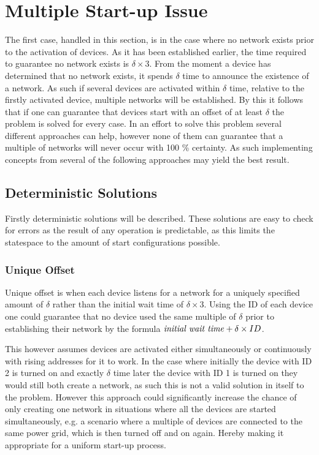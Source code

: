 \section{Multiple Start-up Issue}\label{sec:MSI-CCRC}
The first case, handled in this section, is in the case where no network exists prior to the activation of devices.
As it has been established earlier, the time required to guarantee no network exists is $\delta \times 3$.
From the moment a device has determined that no network exists, it spends $\delta$ time to announce the existence of a network.
As such if several devices are activated within $\delta$ time, relative to the firstly activated device, multiple networks will be established.
By this it follows that if one can guarantee that devices start with an offset of at least $\delta$ the problem is solved for every case.
In an effort to solve this problem several different approaches can help, however none of them can guarantee that a multiple of networks will never occur with 100 \% certainty. 
As such implementing concepts from several of the following approaches may yield the best result.

\subsection{Deterministic Solutions}
Firstly deterministic solutions will be described.
These solutions are easy to check for errors as the result of any operation is predictable, as this limits the statespace to the amount of start configurations possible.

\subsubsection{Unique Offset}
Unique offset is when each device listens for a network for a uniquely specified amount of $\delta$ rather than the initial wait time of $\delta \times 3$.
Using the ID of each device one could guarantee that no device used the same multiple of $\delta$ prior to establishing their network by the formula $\text{\textit{initial wait time}} + \delta \times ID$.

This however assumes devices are activated either simultaneously or continuously with rising addresses for it to work.
In the case where initially the device with ID 2 is turned on and exactly $\delta$ time later the device with ID 1 is turned on they would still both create a network, as such this is not a valid solution in itself to the problem.
However this approach could significantly increase the chance of only creating one network in situations where all the devices are started simultaneously, e.g. a scenario where a multiple of devices are connected to the same power grid, which is then turned off and on again.
Hereby making it appropriate for a uniform start-up process.

